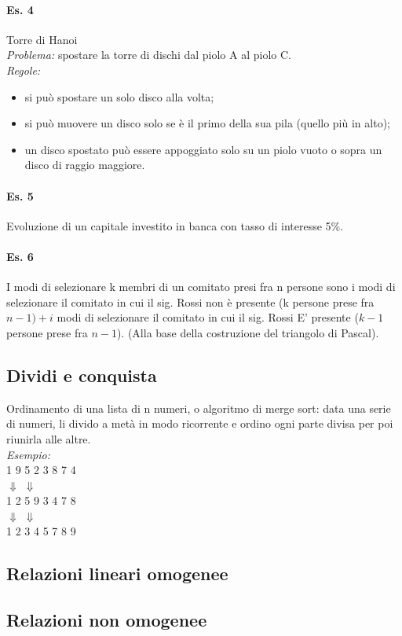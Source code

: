 \paragraph{Es. 4} Torre di Hanoi\\
\textit{Problema:} spostare la torre di dischi dal piolo A al piolo C.\\
\textit{Regole:}
\begin{itemize}
    \item si può spostare un solo disco alla volta;
    \item si può muovere un disco solo se è il primo della sua pila (quello più in alto);
    \item un disco spostato può essere appoggiato solo su un piolo vuoto o sopra un disco di
raggio maggiore.
\end{itemize}

\paragraph{Es. 5} Evoluzione di un capitale investito in banca con tasso di interesse 5\%.

\paragraph{Es. 6} I modi di selezionare k membri di un comitato presi fra n persone sono i modi di
selezionare il comitato in cui il sig. Rossi non è presente (k persone prese fra $n-1) + i$ modi di
selezionare il comitato in cui il sig. Rossi E' presente ($k-1$ persone prese fra $n-1$).
(Alla base della costruzione del triangolo di Pascal).

\subsection{Dividi e conquista}
Ordinamento di una lista di n numeri, o algoritmo di merge sort: data una serie di numeri, li divido a metà in modo ricorrente e ordino ogni parte divisa per poi riunirla alle altre.\\ 
\textit{Esempio:} \\
1 9 5 2    3 8 7 4 \\
$\Downarrow$  $\Downarrow$\\
1 2 5 9    3 4 7 8 \\
$\Downarrow$  $\Downarrow$\\
1 2 3 4 5 7 8 9 \\


\subsection{Relazioni lineari omogenee}


\subsection{Relazioni non omogenee}








\newpage